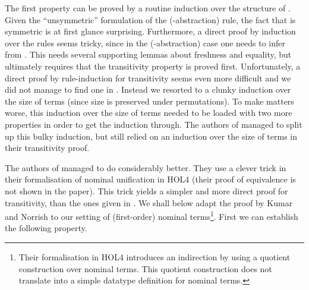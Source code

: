 \begin{isabellebody}
\begin{isamarkuptext}
  \noindent
  The first property can be proved by a routine induction over the structure of . 
  Given the ``unsymmetric'' formulation of the (-abstraction) rule, 
  the fact that  is symmetric is at first glance surprising. Furthermore, a 
  direct proof by induction over the rules seems tricky, since in 
  the (-abstraction) case one needs to infer 
   from . This needs
  several supporting lemmas about freshness and equality, but ultimately requires
  that the transitivity property is proved first. Unfortunately, 
  a direct proof by rule-induction for transitivity seems even more difficult and 
  we did not manage to find one in \cite{UrbanPittsGabbay04}. Instead we resorted 
  to a clunky induction over the 
  size of terms (since size is preserved under permutations). To make matters
  worse, this induction over the
  size of terms needed to be
  loaded with two more properties in order to get 
  the induction through. The authors of \cite{FernandezGabbay07} managed to split 
  up this bulky induction, but still relied on an induction over the size of terms
  in their transitivity proof.

  The authors of \cite{KumarNorrish10} managed to do considerably better.
  They use a clever trick in their formalisation of nominal unification in HOL4 
  (their proof of equivalence is not shown in the paper).
  This trick yields a simpler and more direct proof for transitivity, than the ones given in 
  \cite{UrbanPittsGabbay04,FernandezGabbay07}. We shall below adapt the proof 
  by Kumar and Norrish to our  setting of (first-order) nominal 
  terms\footnote{Their formalisation in HOL4 introduces an
  indirection by using a quotient construction over nominal terms. This quotient
  construction does not translate into a simple datatype definition for 
  nominal terms.}.
  First we can establish the following property. 


\end{isamarkuptext}
\end{isabellebody}
